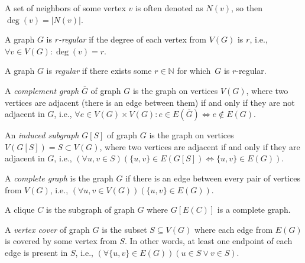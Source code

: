 A set of neighbors of some vertex $v$ is often denoted as $N(v)$, so then $\deg(v) = |N(v)|$.

\begin{definition}
    A graph $G$ is \emph{$r$-regular} if the degree of each vertex from $V(G)$ is $r$, i.e., $\forall v \in V(G) \colon \deg(v) = r$.
\end{definition}

\begin{definition}
    A graph $G$ is \emph{regular} if there exists some $r \in \mathbb{N}$ for which~$G$ is $r$-regular.
\end{definition}

\begin{definition}
    A \emph{complement graph} $\overline{G}$ of graph $G$ is the graph on vertices $V(G)$,
    where two vertices are adjacent (there is an edge between them) if and only if
    they are not adjacent in $G$, i.e., $\forall e \in V(G) \times V(G) \colon e \in E(\overline{G}) \Leftrightarrow e \notin E(G)$.
\end{definition}

\begin{definition}
    An \emph{induced subgraph} $G[S]$ of graph $G$ is the graph on vertices $V(G[S]) = S \subset V(G)$,
    where two vertices are adjacent if and only if they are adjacent in $G$, i.e.,
    $(\forall u,v \in S)(\{u,v\} \in E(G[S]) \Leftrightarrow \{u,v\} \in E(G))$.
\end{definition}

\begin{definition}
    A \emph{complete graph} is the graph $G$ if there is an edge between every pair of vertices from $V(G)$, i.e.,
    $(\forall u,v \in V(G))(\{u,v\} \in E(G))$.
\end{definition}

\begin{definition}[Clique]
    A clique $C$ is the subgraph of graph $G$ where $G[E(C)]$ is a complete graph.
\end{definition}

\begin{definition}
    A \emph{vertex cover} of graph $G$ is the subset $S \subseteq V(G)$ where each edge from $E(G)$ is
    covered by some vertex from $S$. In other words, at least one endpoint of each edge is present in $S$, i.e.,
    $(\forall \{u,v\} \in E(G))(u \in S \vee v \in S)$.
\end{definition}


